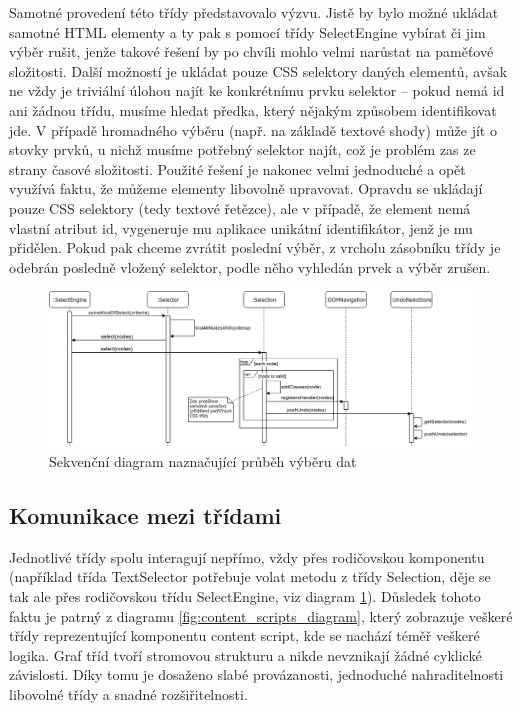 \documentclass[thesis=B,czech]{FITthesis}[2012/06/26]
\begin{document}
\begin{description}
	Samotné provedení této třídy představovalo výzvu. Jistě by bylo možné ukládat samotné HTML elementy a ty pak s pomocí třídy SelectEngine vybírat či jim výběr rušit, jenže takové řešení by po chvíli mohlo velmi narůstat na paměťové složitosti. Další možností je ukládat pouze CSS selektory daných elementů, avšak ne vždy je triviální úlohou najít ke konkrétnímu prvku selektor -- pokud nemá \textsf{id} ani žádnou třídu, musíme hledat předka, který nějakým způsobem identifikovat jde. V případě hromadného výběru (např. na základě textové shody) může jít o stovky prvků, u nichž musíme potřebný selektor najít, což je problém zas ze strany časové složitosti. Použité řešení je nakonec velmi jednoduché a opět využívá faktu, že můžeme elementy libovolně upravovat. Opravdu se ukládají pouze CSS selektory (tedy textové řetězce), ale v případě, že element nemá vlastní atribut \textsf{id}, vygeneruje mu aplikace unikátní identifikátor, jenž je mu přidělen. Pokud pak chceme zvrátit poslední výběr, z vrcholu zásobníku třídy je odebrán posledně vložený selektor, podle něho vyhledán prvek a výběr zrušen.
\end{description}

\begin{figure}
	\includegraphics[width=\linewidth]{images/sequence_diagram.png}
	\caption{Sekvenční diagram naznačující průběh výběru dat}
	\label{fig:sequence_diagram}
\end{figure}

\subsection{Komunikace mezi třídami}
Jednotlivé třídy spolu interagují nepřímo, vždy přes rodičovskou komponentu (například třída TextSelector potřebuje volat metodu z třídy Selection, děje se tak ale přes rodičovskou třídu SelectEngine, viz diagram \ref{fig:sequence_diagram}). Důsledek tohoto faktu je patrný z diagramu \ref{fig:content_scripts_diagram}, který zobrazuje veškeré třídy reprezentující komponentu content script, kde se nachází téměř veškeré logika. Graf tříd tvoří stromovou strukturu a nikde nevznikají žádné cyklické závislosti. Díky tomu je dosaženo slabé provázanosti, jednoduché nahraditelnosti libovolné třídy a snadné rozšiřitelnosti.
\end{document}
